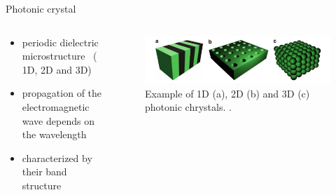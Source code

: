 \begin{frame}{Photonic crystal}
  \begin{columns}

    \begin{column}{0.49\textwidth}
    \begin{itemize}
      \setlength\itemsep{1.2em}
      \item{periodic dielectric microstructure \, ( 1D, 2D and 3D)}
      \item{propagation of the electromagnetic wave depends on the wavelength}
      \item{characterized by their band structure }
    \end{itemize}
    \end{column}

    \begin{column}{0.49\textwidth}
    \begin{figure}
      \centering
      \includegraphics[width=1\textwidth]{./bilder/photonic_crystal_model.png}
      \caption{Example of 1D (a), 2D (b) and 3D (c) photonic chrystals. \cite{intro_pho}.}
      \label{fig: photonic_crystal}
    \end{figure}
  \end{column}

  \end{columns}

\end{frame}


